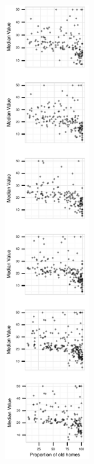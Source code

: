 \begin{figure}
\begin{subfigure}[t]{1.5in}
	\caption{}
	 \label{fig:method_actual}
    \end{subfigure}
    \begin{subfigure}[t]{1.5in}
 	 \includegraphics[width=1.5in]{images/randCluster.pdf}
	 \label{fig:method_random}
 	\caption{}
    \end{subfigure}
     \begin{subfigure}[t]{2.5in}

\end{subfigure}
\end{figure}
